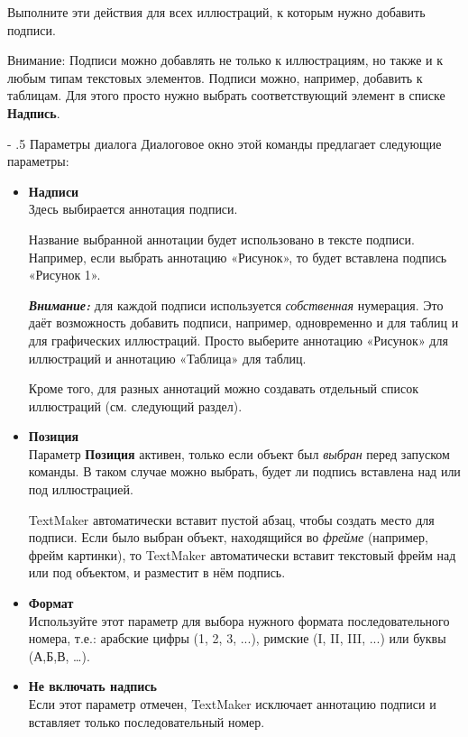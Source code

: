 ﻿\documentclass[a4paper,10pt]{article}
\makeatletter
\renewcommand\paragraph{%
   \@startsection{paragraph}{4}{0mm}%
      {-\baselineskip}%
      {.5\baselineskip}%
      {\normalfont\normalsize\bfseries}}
\makeatother
\begin{document}
Выполните эти действия для всех иллюстраций, к которым нужно добавить подписи.

Внимание: Подписи можно добавлять не только к иллюстрациям, но также и к любым типам текстовых элементов. Подписи можно, например, добавить к таблицам. Для этого просто нужно выбрать соответствующий элемент в списке \textbf{Надпись}.

\paragraph{Параметры диалога}
Диалоговое окно этой команды предлагает следующие параметры:
\begin{itemize}
 \item \textbf{Надписи}\\
 Здесь выбирается аннотация подписи.
 
 Название выбранной аннотации будет использовано в тексте подписи. Например, если выбрать аннотацию «Рисунок», то будет вставлена подпись «Рисунок 1».
 
 \begin{mdframed}[backgroundcolor=blue!10]
\textbf{\textit{Внимание:}} для каждой подписи используется \textit{собственная} нумерация. Это даёт возможность добавить подписи, например, одновременно и для таблиц и для графических иллюстраций. Просто выберите аннотацию «Рисунок» для иллюстраций и аннотацию «Таблица» для таблиц.

Кроме того, для разных аннотаций можно создавать отдельный список иллюстраций (см. следующий раздел).
\end{mdframed}
\item \textbf{Позиция}\\
Параметр \textbf{Позиция} активен, только если объект был \textit{выбран} перед запуском команды. В таком случае можно выбрать, будет ли подпись вставлена над или под иллюстрацией.

TextMaker автоматически вставит пустой абзац, чтобы создать место для подписи. Если было выбран объект, находящийся во \textit{фрейме} (например, фрейм картинки), то TextMaker автоматически вставит текстовый фрейм над или под объектом, и разместит в нём подпись.
\item \textbf{Формат}\\
Используйте этот параметр для выбора нужного формата последовательного номера, т.е.: арабские цифры (1, 2, 3, ...), римские (I, II, III, ...) или буквы (А,Б,В, …).
\item \textbf{Не включать надпись}\\
Если этот параметр отмечен, TextMaker исключает аннотацию подписи и вставляет только последовательный номер.


\end{itemize}
\end{document}
